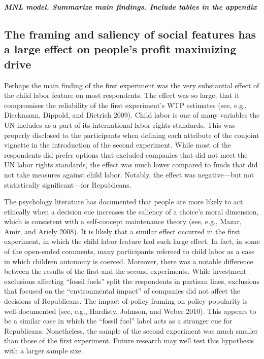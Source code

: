 \documentclass[
  12pt,
]{article}
\begin{document}
\textbf{\emph{MNL model. Summarize main findings. Include tables in the appendix}}

\hypertarget{the-framing-and-saliency-of-social-features-has-a-large-effect-on-peoples-profit-maximizing-drive}{%
\subsection{The framing and saliency of social features has a large effect on people's profit maximizing drive}\label{the-framing-and-saliency-of-social-features-has-a-large-effect-on-peoples-profit-maximizing-drive}}

Perhaps the main finding of the first experiment was the very substantial effect of the child labor feature on most respondents. The effect was so large, that it compromises the reliability of the first experiment's WTP estimates (see, e.g., Dieckmann, Dippold, and Dietrich 2009). Child labor is one of many variables the UN includes as a part of its international labor rights standards. This was properly disclosed to the participants when defining each attribute of the conjoint vignette in the introduction of the second experiment. While most of the respondents did prefer options that excluded companies that did not meet the UN labor rights standards, the effect was much lower compared to funds that did not take measures against child labor. Notably, the effect was negative---but not statistically significant---for Republicans.

The psychology literature has documented that people are more likely to act ethically when a decision cue increases the saliency of a choice's moral dimension, which is consistent with a self-concept maintenance theory (see, e.g., Mazar, Amir, and Ariely 2008). It is likely that a similar effect occurred in the first experiment, in which the child labor feature had such large effect. In fact, in some of the open-ended comments, many participants refereed to child labor as a case in which children autonomy is coerced. Moreover, there was a notable difference between the results of the first and the second experiments. While investment exclusions affecting ``fossil fuels'' split the respondents in partisan lines, exclusions that focused on the ``environmental impact'' of companies did not affect the decisions of Republicans. The impact of policy framing on policy popularity is well-documented (see, e.g., Hardisty, Johnson, and Weber 2010). This appears to be a similar case in which the ``fossil fuel'' label acts as a stronger cue for Republicans. Nonetheless, the sample of the second experiment was much smaller than those of the first experiment. Future research may well test this hypothesis with a larger sample size.
\end{document}
